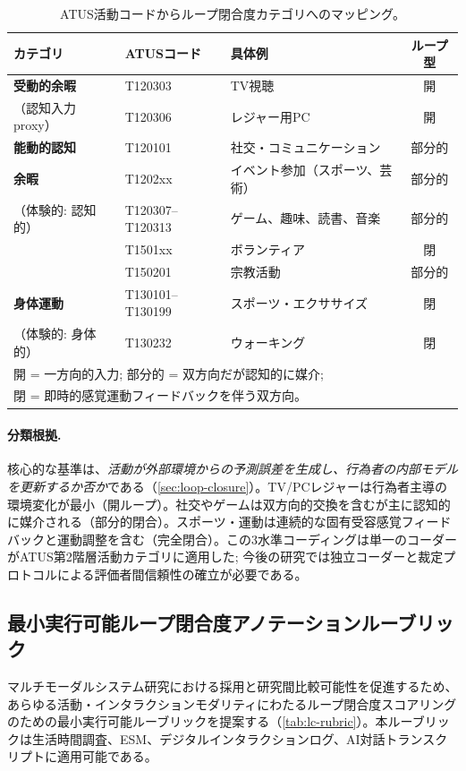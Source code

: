 \documentclass[a4paper,11pt,titlepage]{article}
\begin{document}
\begin{table}[htbp]
\centering
\caption{ATUS活動コードからループ閉合度カテゴリへのマッピング。}
\label{tab:atus-codebook}
\small
\begin{tabular}{lllc}
\toprule
カテゴリ & ATUSコード & 具体例 & ループ型 \\
\midrule
\textbf{受動的余暇} & T120303 & TV視聴 & 開 \\
（認知入力proxy） & T120306 & レジャー用PC & 開 \\
\midrule
\textbf{能動的認知} & T120101 & 社交・コミュニケーション & 部分的 \\
\textbf{余暇} & T1202xx & イベント参加（スポーツ、芸術） & 部分的 \\
（体験的: 認知的） & T120307--T120313 & ゲーム、趣味、読書、音楽 & 部分的 \\
& T1501xx & ボランティア & 閉 \\
& T150201 & 宗教活動 & 部分的 \\
\midrule
\textbf{身体運動} & T130101--T130199 & スポーツ・エクササイズ & 閉 \\
（体験的: 身体的） & T130232 & ウォーキング & 閉 \\
\bottomrule
\multicolumn{4}{l}{\scriptsize 開 = 一方向的入力; 部分的 = 双方向だが認知的に媒介;} \\
\multicolumn{4}{l}{\scriptsize 閉 = 即時的感覚運動フィードバックを伴う双方向。}
\end{tabular}
\end{table}

\paragraph{分類根拠.} 核心的な基準は、\textit{活動が外部環境からの予測誤差を生成し、行為者の内部モデルを更新するか否か}である（\cref{sec:loop-closure}）。TV/PCレジャーは行為者主導の環境変化が最小（開ループ）。社交やゲームは双方向的交換を含むが主に認知的に媒介される（部分的閉合）。スポーツ・運動は連続的な固有受容感覚フィードバックと運動調整を含む（完全閉合）。この3水準コーディングは単一のコーダーがATUS第2階層活動カテゴリに適用した; 今後の研究では独立コーダーと裁定プロトコルによる評価者間信頼性の確立が必要である。


\subsection{最小実行可能ループ閉合度アノテーションルーブリック}\label{app:rubric}

マルチモーダルシステム研究における採用と研究間比較可能性を促進するため、あらゆる活動・インタラクションモダリティにわたるループ閉合度スコアリングのための最小実行可能ルーブリックを提案する（\cref{tab:lc-rubric}）。本ルーブリックは生活時間調査、ESM、デジタルインタラクションログ、AI対話トランスクリプトに適用可能である。
\end{document}
